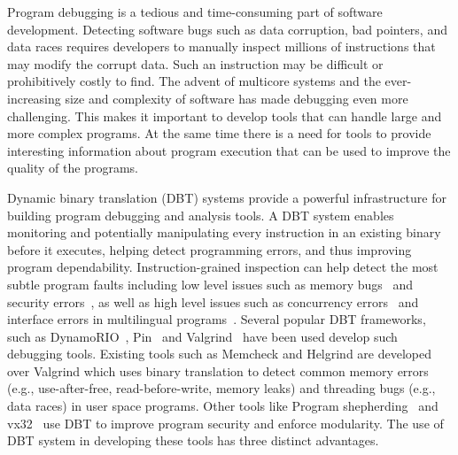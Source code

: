 Program debugging is a tedious and time-consuming part of software development. Detecting software bugs such as data corruption, bad pointers, and data races requires developers to manually inspect millions of instructions that may modify the corrupt data. Such an instruction may be difficult or prohibitively costly to find. The advent of multicore systems and the ever-increasing size and complexity of software has made debugging even more challenging. This makes it important to develop tools that can handle large and more complex programs. At the same time there is a need for tools to provide interesting information about program execution that can be used to improve the quality of the programs. 

Dynamic binary translation (DBT) systems provide a powerful infrastructure for building program debugging and analysis tools. A DBT system enables monitoring and potentially manipulating every instruction in an existing binary before it executes, helping detect programming errors, and thus improving program dependability.
Instruction-grained inspection can help detect the most subtle program faults including low level issues such as memory bugs~\cite{Nethercote:2007:VFH:1250734.1250746} and security errors~\cite{NewsomeS05, Costa:2005:VEC:1095810.1095824}, as well as high level issues such as concurrency errors~\cite{Patil:2010:PFD:1772954.1772958, citeulike:7549409} and interface errors in multilingual programs~\cite{Lee:2010:JSD:1806596.1806601}. Several popular DBT frameworks, such as DynamoRIO~\cite{DynamoRIO}, Pin~\cite{PinOS} and Valgrind~\cite{Nethercote:2007:VFH:1250734.1250746} have been used develop such debugging tools. Existing tools such as Memcheck \cite{Seward:2005:UVD:1247360.1247362} and Helgrind \cite{Muehlenfeld:2007:FDM:1229428.1229457} are developed over Valgrind which uses binary translation to detect common memory errors (e.g., use-after-free, read-before-write, memory leaks) and threading bugs (e.g., data races) in user space programs. Other tools like Program shepherding~\cite{Kiriansky:2002:SEV:647253.720293} and vx32~\cite{Ford:2008:VLU:1404014.1404039} use DBT to improve program security and enforce modularity. The use of DBT system in developing these tools has three distinct advantages.



